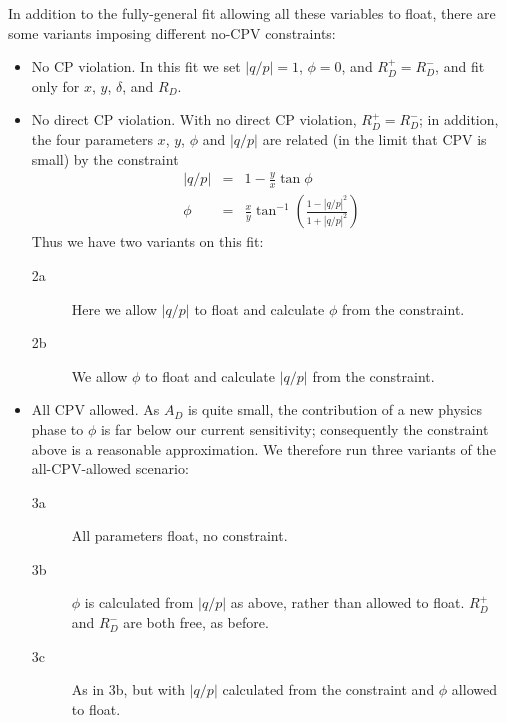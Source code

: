In addition to the fully-general fit allowing all these variables to float, 
there are some variants imposing different no-CPV constraints:
\begin{itemize}
\item No CP violation. In this fit we set $|q/p|=1$, $\phi=0$, and $R_D^+=R_D^-$, 
and fit only for $x$, $y$, $\delta$, and $R_D$. 
\item No direct CP violation. With no direct CP violation, $R_D^+=R_D^-$;
in addition, the four parameters $x$, $y$, $\phi$ and $|q/p|$ are related 
(in the limit that CPV is small) by the constraint
\begin{eqnarray}
|q/p| &=& 1 - \frac{y}{x}\tan\phi\\
\phi &=& \frac{x}{y}\tan^{-1}\left(\frac{1-|q/p|^2}{1+|q/p|^2}\right)
\end{eqnarray}
Thus we have two variants on this fit:
\begin{description}
\item[2a] Here we allow $|q/p|$ to float and calculate $\phi$
from the constraint. 
\item[2b] We allow $\phi$ to float and calculate $|q/p|$ from the constraint. 
\end{description}
\item All CPV allowed. As $A_D$ is quite
small, the contribution of a new physics phase to $\phi$ is far below
our current sensitivity; consequently the constraint above is a reasonable
approximation. We therefore run three variants of the all-CPV-allowed 
scenario:
\begin{description}
\item[3a] All parameters float, no constraint.
\item[3b] $\phi$ is calculated from $|q/p|$ as above, rather than allowed to float.
$R_D^+$ and $R_D^-$ are both free, as before.
\item[3c] As in 3b, but with $|q/p|$ calculated from the constraint and $\phi$ allowed
to float.
\end{description}
\end{itemize}

